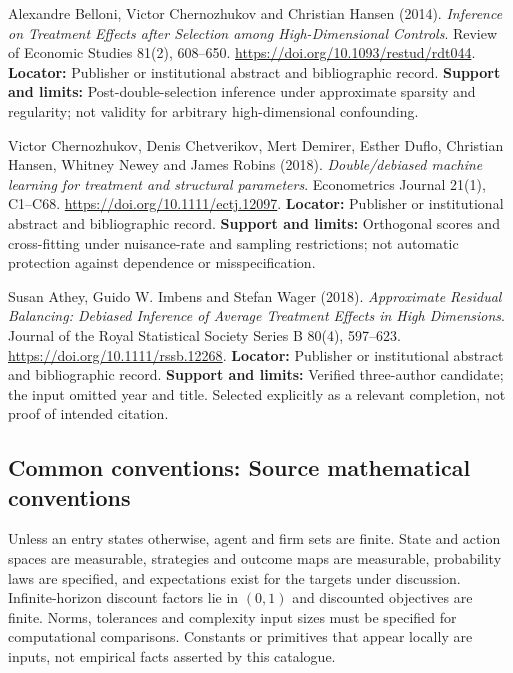 \documentclass[11pt,a4paper]{article}
\begin{document}
\begin{enumerate}[label={[\textnormal{S}\arabic*]},leftmargin=*]

\item Alexandre Belloni, Victor Chernozhukov and Christian Hansen (2014). \emph{Inference on Treatment Effects after Selection among High-Dimensional Controls}. Review of Economic Studies 81(2), 608–650. \url{https://doi.org/10.1093/restud/rdt044}. \textbf{Locator:} Publisher or institutional abstract and bibliographic record. \textbf{Support and limits:} Post-double-selection inference under approximate sparsity and regularity; not validity for arbitrary high-dimensional confounding.

\item Victor Chernozhukov, Denis Chetverikov, Mert Demirer, Esther Duflo, Christian Hansen, Whitney Newey and James Robins (2018). \emph{Double/debiased machine learning for treatment and structural parameters}. Econometrics Journal 21(1), C1–C68. \url{https://doi.org/10.1111/ectj.12097}. \textbf{Locator:} Publisher or institutional abstract and bibliographic record. \textbf{Support and limits:} Orthogonal scores and cross-fitting under nuisance-rate and sampling restrictions; not automatic protection against dependence or misspecification.

\item Susan Athey, Guido W. Imbens and Stefan Wager (2018). \emph{Approximate Residual Balancing: Debiased Inference of Average Treatment Effects in High Dimensions}. Journal of the Royal Statistical Society Series B 80(4), 597–623. \url{https://doi.org/10.1111/rssb.12268}. \textbf{Locator:} Publisher or institutional abstract and bibliographic record. \textbf{Support and limits:} Verified three-author candidate; the input omitted year and title. Selected explicitly as a relevant completion, not proof of intended citation.

\end{enumerate}

\subsection*{Common conventions: Source mathematical conventions}

Unless an entry states otherwise, agent and firm sets are finite. State and action spaces are measurable, strategies and outcome maps are measurable, probability laws are specified, and expectations exist for the targets under discussion. Infinite-horizon discount factors lie in $(0,1)$ and discounted objectives are finite. Norms, tolerances and complexity input sizes must be specified for computational comparisons. Constants or primitives that appear locally are inputs, not empirical facts asserted by this catalogue.
\end{document}
